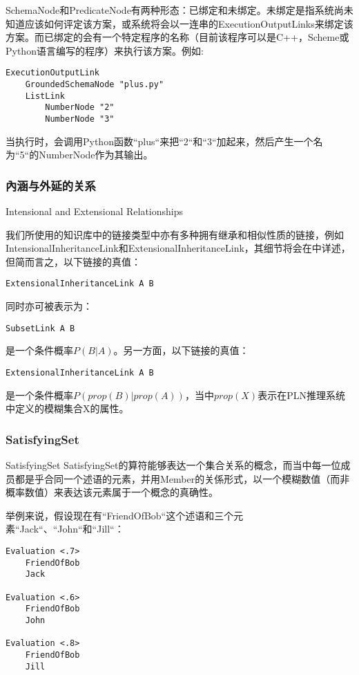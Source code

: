 SchemaNode和PredicateNode有两种形态：已绑定和未绑定。未绑定是指系统尚未知道应该如何评定该方案，或系统将会以一连串的ExecutionOutputLinks来绑定该方案。而已绑定的会有一个特定程序的名称（目前该程序可以是C++，Scheme或Python语言编写的程序）来执行该方案。例如:

\begin{verbatim}
ExecutionOutputLink
	GroundedSchemaNode "plus.py"
	ListLink
		NumberNode "2"
		NumberNode "3"
\end{verbatim}

\noindent 当执行时，会调用Python函数“plus“来把“2“和“3“加起来，然后产生一个名为“5“的NumberNode作为其输出。

\subsubsection{內涵与外延的关系}{Intensional and Extensional Relationships}


我们所使用的知识库中的链接类型中亦有多种拥有继承和相似性质的链接，例如IntensionalInheritanceLink和ExtensionalInheritanceLink，其细节将会在\cite{PLN}中详述，但简而言之，以下链接的真值：

\begin{verbatim}
ExtensionalInheritanceLink A B
\end{verbatim}

\noindent 同时亦可被表示为：

\begin{verbatim}
SubsetLink A B
\end{verbatim}

\noindent 是一个条件概率$P(B|A)$。另一方面，以下链接的真值：

\begin{verbatim}
ExtensionalInheritanceLink A B
\end{verbatim}

\noindent 是一个条件概率$P(prop(B)|prop(A))$，当中$prop(X)$表示在PLN推理系统中定义的模糊集合X的属性。

\subsubsection{SatisfyingSet}{SatisfyingSet}
SatisfyingSet的算符能够表达一个集合关系的概念，而当中每一位成员都是乎合同一个述语的元素，并用Member的关係形式，以一个模糊数值（而非概率数值）来表达该元素属于一个概念的真确性。

举例来说，假设现在有“FriendOfBob“这个述语和三个元素“Jack“、“John“和“Jill“：

\begin{verbatim}
Evaluation <.7>
	FriendOfBob
	Jack

Evaluation <.6>
	FriendOfBob
	John

Evaluation <.8>
	FriendOfBob
	Jill
\end{verbatim}

